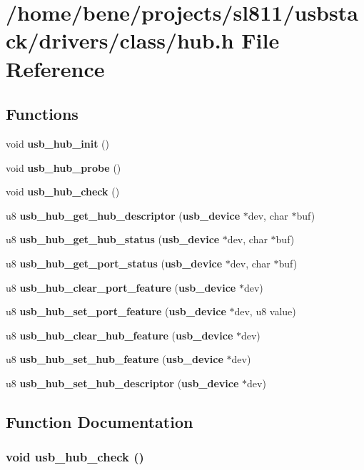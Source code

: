 \section{/home/bene/projects/sl811/usbstack/drivers/class/hub.h File Reference}
\label{hub_8h}
\subsection*{Functions}
\begin{CompactItemize}
\item 
void {\bf usb\_\-hub\_\-init} ()
\item 
void {\bf usb\_\-hub\_\-probe} ()
\item 
void {\bf usb\_\-hub\_\-check} ()
\item 
u8 {\bf usb\_\-hub\_\-get\_\-hub\_\-descriptor} ({\bf usb\_\-device} $\ast$dev, char $\ast$buf)
\item 
u8 {\bf usb\_\-hub\_\-get\_\-hub\_\-status} ({\bf usb\_\-device} $\ast$dev, char $\ast$buf)
\item 
u8 {\bf usb\_\-hub\_\-get\_\-port\_\-status} ({\bf usb\_\-device} $\ast$dev, char $\ast$buf)
\item 
u8 {\bf usb\_\-hub\_\-clear\_\-port\_\-feature} ({\bf usb\_\-device} $\ast$dev)
\item 
u8 {\bf usb\_\-hub\_\-set\_\-port\_\-feature} ({\bf usb\_\-device} $\ast$dev, u8 value)
\item 
u8 {\bf usb\_\-hub\_\-clear\_\-hub\_\-feature} ({\bf usb\_\-device} $\ast$dev)
\item 
u8 {\bf usb\_\-hub\_\-set\_\-hub\_\-feature} ({\bf usb\_\-device} $\ast$dev)
\item 
u8 {\bf usb\_\-hub\_\-set\_\-hub\_\-descriptor} ({\bf usb\_\-device} $\ast$dev)
\end{CompactItemize}


\subsection{Function Documentation}
\subsubsection{\setlength{\rightskip}{0pt plus 5cm}void usb\_\-hub\_\-check ()}\label{hub_8h_24ec349a0e4c1ac7b29402a95b8737e3}


